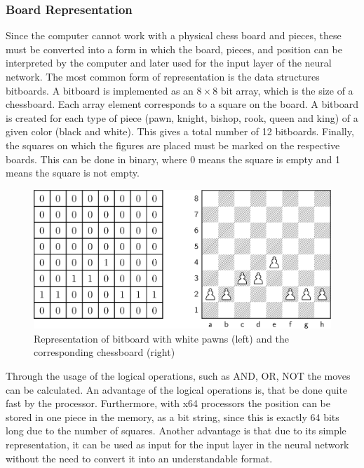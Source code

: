 \subsubsection{Board Representation}

Since the computer cannot work with a physical chess board and pieces, these must be converted into a form in which the board, pieces, and position can be interpreted by the computer and later used for the input layer of the neural network. The most common form of representation is the data structures bitboards. A bitboard is implemented as an $8 \times 8$ bit array, which is the size of a chessboard. Each array element corresponds to a square on the board. A bitboard is created for each type of piece (pawn, knight, bishop, rook, queen and king) of a given color (black and white). This gives a total number of 12 bitboards. Finally, the squares on which the figures are placed must be marked on the respective boards. This can be done in binary, where 0 means the square is empty and 1 means the square is not empty.

\begin{figure}[h]
\centering
\includegraphics[scale=0.13]{graphics/bitboard/bitboard_and_chessboard.png}
\caption{Representation of bitboard with white pawns (left) and the corresponding chessboard (right)}
\end{figure}

Through the usage of the logical operations, such as AND, OR, NOT the moves can be calculated. An advantage of the logical operations is, that be done quite fast by the processor. Furthermore, with x64 processors the position can be stored in one piece in the memory, as a bit string, since this is exactly 64 bits long due to the number of squares. Another advantage is that due to its simple representation, it can be used as input for the input layer in the neural network without the need to convert it into an understandable format.